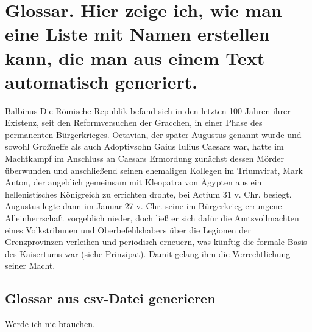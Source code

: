 
\chapter[Glossar]{Glossar. Hier zeige ich, wie man eine Liste mit Namen erstellen kann, die man aus einem Text automatisch generiert.}

\gls{Balbinus}
Die Römische Republik befand sich in den letzten 100 Jahren ihrer Existenz, seit den Reformversuchen der Gracchen, in einer Phase des permanenten Bürgerkrieges. Octavian, der später \gls{Augustus} genannt wurde und sowohl Großneffe als auch Adoptivsohn Gaius Iulius Caesars war, hatte im Machtkampf im Anschluss an Caesars Ermordung zunächst dessen Mörder überwunden und anschließend seinen ehemaligen Kollegen im Triumvirat, Mark Anton, der angeblich gemeinsam mit Kleopatra von Ägypten aus ein hellenistisches Königreich zu errichten drohte, bei Actium 31 v. Chr. besiegt. \gls{Augustus} legte dann im Januar 27 v. Chr. seine im Bürgerkrieg errungene Alleinherrschaft vorgeblich nieder, doch ließ er sich dafür die Amtsvollmachten eines Volkstribunen und Oberbefehlshabers über die Legionen der Grenzprovinzen verleihen und periodisch erneuern, was künftig die formale Basis des Kaisertums war (siehe Prinzipat). Damit gelang ihm die Verrechtlichung seiner Macht.


\printglossary[
title={Liste der römischen Kaiser},
style = index]%

\section{Glossar aus csv-Datei generieren}


Werde ich nie brauchen. 

